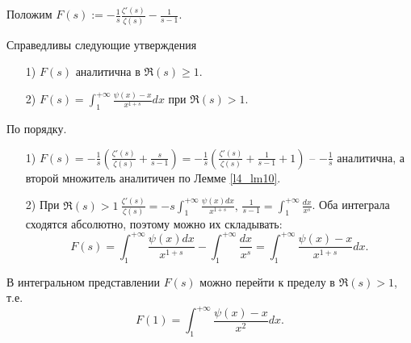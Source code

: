 Положим $\displaystyle F(s) := -\frac{1}{s}\frac{\zeta'(s)}{\zeta(s)} - \frac{1}{s-1}$.\\
\begin{lemma} \label{l2_lm11}
	Справедливы следующие утверждения
	\begin{enumerate}[nolistsep]
		\item[1)] $F(s)$ аналитична в $\Re(s) \geq 1$.
		\item[2)] $\displaystyle F(s) = \int_1^{+\infty} \frac{\psi(x)-x}{x^{1+s}}dx$ при $\Re(s) > 1$.
	\end{enumerate}
\end{lemma}
\begin{pf}
	По порядку.
	\begin{enumerate}[nolistsep]
		\item[1)] $\displaystyle F(s) = -\frac{1}{s}\left( \frac{\zeta'(s)}{\zeta(s)} + \frac{s}{s-1} \right) = -\frac{1}{s}\left( \frac{\zeta'(s)}{\zeta(s)} + \frac{1}{s-1} +1 \right)$ -- $\displaystyle -\frac{1}{s}$ аналитична, а второй множитель аналитичен по Лемме \ref{l4_lm10}.
		\item[2)] При $\displaystyle \Re(s)>1 \ \frac{\zeta'(s)}{\zeta(s)} = -s\int_1^{+\infty} \frac{\psi(x)dx}{x^{1+s}}, \, \frac{1}{s-1}=\int_1^{+\infty}\frac{dx}{x^s}$. Оба интеграла сходятся абсолютно, поэтому можно их складывать:
			$$F(s) = \int_1^{+\infty}\frac{\psi(x)dx}{x^{1+s}} - \int_1^{+\infty} \frac{dx}{x^s} = \int_1^{+\infty} \frac{\psi(x)-x}{x^{1+s}}dx.$$
	\end{enumerate}
\end{pf}

\begin{theorem} \label{l4_thm7}
	В интегральном представлении $F(s)$ можно перейти к пределу в $\Re(s)>1$, т.е.
	$$F(1) = \int_1^{+\infty} \frac{\psi(x)-x}{x^2}dx.$$
\end{theorem}

